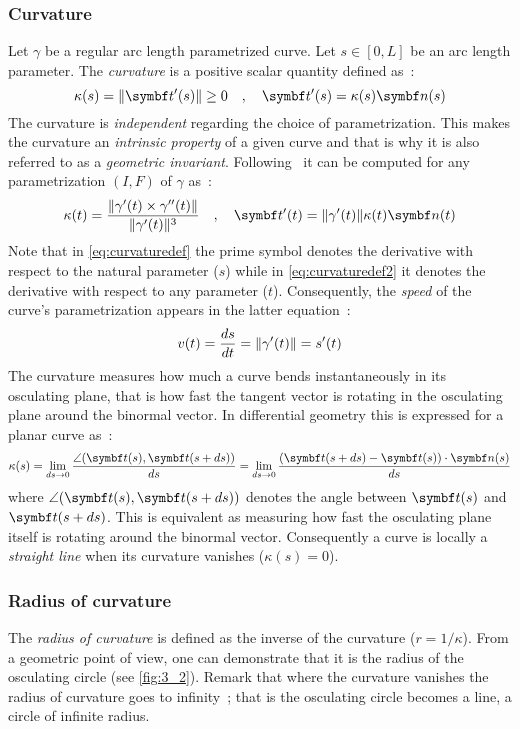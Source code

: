 \subsubsection{Curvature}
Let $\gamma$ be a regular arc length parametrized curve. Let $s \in [0,L]$ be an arc length parameter. The \emph{curvature} is a positive scalar quantity defined as~:
\begin{equation}
	\kappa(s) = \norm{\vect{t}'(s)} \ge 0 
	\quad,\quad
	\vect{t}'(s) = \kappa(s) \vect{n}(s)
\label{eq:curvaturedef}
\end{equation}
The curvature is \emph{independent} regarding the choice of parametrization. This makes the curvature an \emph{intrinsic property} of a given curve and that is why it is also referred to as a \emph{geometric invariant}. Following~\cite[pp.203-204]{Gray2006} it can be computed for any parametrization $(I,F)$ of $\gamma$ as~:
\begin{equation}
	\kappa(t) = \frac{\norm{\gamma'(t) \times \gamma''(t)}}{\norm{\gamma'(t)}^3}
	\quad,\quad
	\vect{t}'(t) = \norm{\gamma'(t)} \kappa(t) \vect{n}(t)
\label{eq:curvaturedef2}
\end{equation}
Note that in \cref{eq:curvaturedef} the prime symbol denotes the derivative with respect to the natural parameter ($s$) while in \cref{eq:curvaturedef2} it denotes the derivative with respect to any parameter ($t$). Consequently, the \emph{speed} of the curve's parametrization appears in the latter equation~:
\begin{equation}
	v(t) = \frac{ds}{dt} = \lVert\gamma'(t)\rVert = s'(t)
\end{equation}
The curvature measures how much a curve bends instantaneously in its osculating plane, that is how fast the tangent vector is rotating in the osculating plane around the binormal vector. In differential geometry this is expressed for a planar curve as~:
\begin{equation}
	\kappa(s)
	= \lim_{ds \to 0}\frac{\angle(\vect{t}(s),\vect{t}(s+ds))}{ds}
	= \lim_{ds \to 0}\frac{(\vect{t}(s+ds) - \vect{t}(s)) \cdot \vect{n}(s)}{ds}
\end{equation}
where $\angle(\vect{t}(s),\vect{t}(s+ds))$ denotes the angle between $\vect{t}(s)$ and $\vect{t}(s+ds)$. This is equivalent as measuring how fast the osculating plane itself is rotating around the binormal vector. Consequently a curve is locally a \emph{straight line} when its curvature vanishes ($\kappa(s)= 0$).

\subsubsection{Radius of curvature}
The \emph{radius of curvature} is defined as the inverse of the curvature ($r= 1/\kappa$). From a geometric point of view, one can demonstrate that it is the radius of the osculating circle (see \cref{fig:3_2}). Remark that where the curvature vanishes the radius of curvature goes to infinity~; that is the osculating circle becomes a line, a circle of infinite radius.

